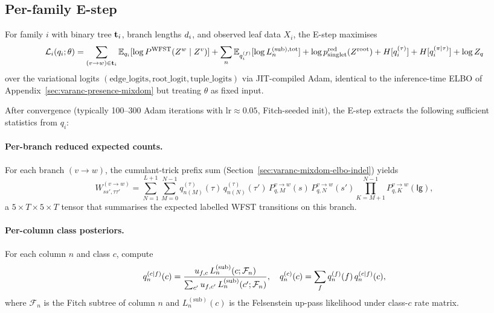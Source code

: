\subsection{Per-family E-step}
\label{sec:vbem-estep}

For family $i$ with binary tree $\mathbf{t}_i$, branch lengths
$d_i$, and observed leaf data $X_i$, the E-step maximises
\begin{equation}
\label{eq:vbem-estep-elbo}
\mathcal{L}_i(q_i; \theta) =
   \sum_{(v\to w) \in \mathbf{t}_i} \mathbb{E}_{q_i}[\log P^{\mathrm{WFST}}(Z^w \mid Z^v)]
   + \sum_n \mathbb{E}_{q_i^{(f)}}[\log L^{(\mathrm{sub}),\text{tot}}_n]
   + \log p^{\text{red}}_\text{singlet}(Z^{\text{root}})
   + H[q_i^{(\tau)}] + H[q_i^{(\pi|\tau)}] + \log Z_q
\end{equation}
over the variational logits $(\text{edge\_logits}, \text{root\_logit},
\text{tuple\_logits})$ via JIT-compiled Adam, identical to the
inference-time ELBO of Appendix~\ref{sec:varanc-presence-mixdom} but
treating $\theta$ as fixed input.

After convergence (typically 100--300 Adam iterations with $\text{lr}
\approx 0.05$, Fitch-seeded init), the E-step extracts the following
sufficient statistics from $q_i$:

\paragraph{Per-branch reduced expected counts.}
For each branch $(v\to w)$, the cumulant-trick prefix sum
(Section~\ref{sec:varanc-mixdom-elbo-indel}) yields
\begin{equation}
\label{eq:W-tensor}
W^{(v\to w)}_{ss', \tau\tau'} =
   \sum_{N=1}^{L+1} \sum_{M=0}^{N-1}
      q^{(\tau)}_{n(M)}(\tau)\, q^{(\tau)}_{n(N)}(\tau')\,
      P^{v\to w}_{q,M}(s)\, P^{v\to w}_{q,N}(s')
      \prod_{K=M+1}^{N-1} P^{v\to w}_{q,K}(\mathsf{Ig}),
\end{equation}
a $5 \times T \times 5 \times T$ tensor that summarises the expected
labelled WFST transitions on this branch.

\paragraph{Per-column class posteriors.}
For each column $n$ and class $c$, compute
\begin{equation}
\label{eq:vbem-class-posterior}
q^{(c|f)}_n(c) = \frac{u_{f, c}\, L^{(\mathrm{sub})}_n(c; \mathcal{F}_n)}
                       {\sum_{c'} u_{f, c'}\, L^{(\mathrm{sub})}_n(c'; \mathcal{F}_n)},
\quad
q^{(c)}_n(c) = \sum_f q^{(f)}_n(f)\, q^{(c|f)}_n(c),
\end{equation}
where $\mathcal{F}_n$ is the Fitch subtree of column $n$ and
$L^{(\mathrm{sub})}_n(c)$ is the Felsenstein up-pass likelihood under
class-$c$ rate matrix.

